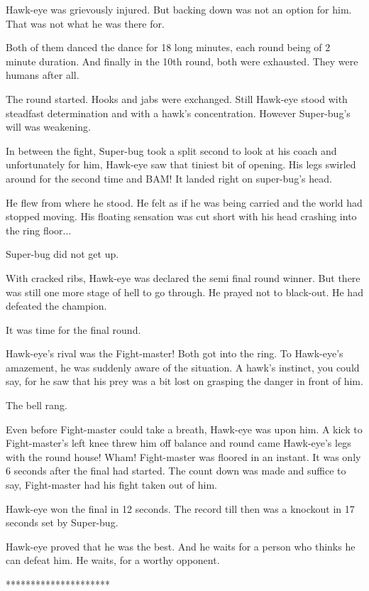 \documentclass[twoside,11pt,titlepage]{article}
\begin{document}
Hawk-eye was grievously injured. But backing down was not an option for him. That was not what he was there for.

Both of them danced the dance for 18 long minutes, each round being of 2 minute duration. And finally in the 10th round, both were exhausted. They were humans after all.

The round started. Hooks and jabs were exchanged. Still Hawk-eye stood with steadfast determination and with a hawk's concentration. However Super-bug's will was weakening.

In between the fight, Super-bug took a split second to look at his coach and unfortunately for him, Hawk-eye saw that tiniest bit of opening. His legs swirled around for the second time and BAM! It landed right on super-bug's head.

He flew from where he stood. He felt as if he was being carried and the world had stopped moving. His floating sensation was cut short with his head crashing into the ring floor...

Super-bug did not get up.

With cracked ribs, Hawk-eye was declared the semi final round winner. But there was still one more stage of hell to go through. He prayed not to black-out. He had defeated the champion.

It was time for the final round.

Hawk-eye's rival was the Fight-master! Both got into the ring. To Hawk-eye's amazement, he was suddenly aware of the situation. A hawk's instinct, you could say, for he saw that his prey was a bit lost on grasping the danger in front of him.

The bell rang.

Even before Fight-master could take a breath, Hawk-eye was upon him. A kick to Fight-master's left knee threw him off balance and round came Hawk-eye's legs with the round house! Wham! Fight-master was floored in an instant. It was only 6 seconds after the final had started. The count down was made and suffice to say, Fight-master had his fight taken out of him.

Hawk-eye won the final in 12 seconds. The record till then was a knockout in 17 seconds set by Super-bug.

Hawk-eye proved that he was the best. And he waits for a person who thinks he can defeat him. He waits, for a worthy opponent.

\bigskip
\begin{center}
*********************
\end{center}
\end{document}
